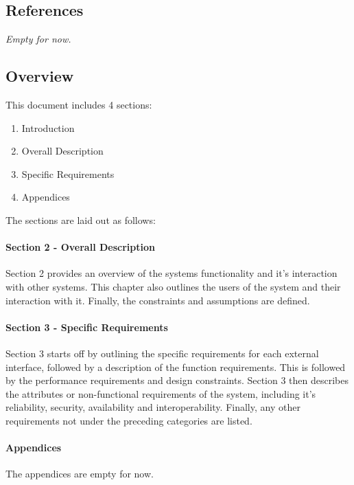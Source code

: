 	\subsection{References}
	\textit{Empty for now.}
	\subsection{Overview}
	This document includes 4 sections:
	\begin{enumerate}
		\item Introduction
		\item Overall Description
		\item Specific Requirements
		\item Appendices
	\end{enumerate}
	The sections are laid out as follows:
	\paragraph{Section 2 - Overall Description}
	Section 2 provides an overview of the systems functionality and it's interaction with other systems. This chapter also outlines the users of the system and their interaction with it. Finally, the constraints and assumptions are defined.
	\paragraph{Section 3 - Specific Requirements}
	Section 3 starts off by outlining the specific requirements for each external interface, followed by a description of the function requirements. This is followed by the performance requirements and design constraints. Section 3 then describes the attributes or non-functional requirements of the system, including it's reliability, security, availability and interoperability. Finally, any other requirements not under the preceding categories are listed.
	\paragraph{Appendices}
	The appendices are empty for now.